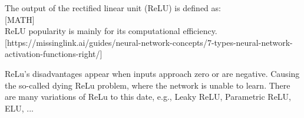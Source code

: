 
The output of the rectified linear unit (ReLU) is defined as:\\

[MATH]\\

ReLU popularity is mainly for its computational efficiency.
[https://missinglink.ai/guides/neural-network-concepts/7-types-neural-network-activation-functions-right/]

ReLu's disadvantages appear when inputs approach zero or are negative. Causing the so-called dying ReLu problem, where the network is unable to learn.
There are many variations of ReLu to this date, e.g., Leaky ReLU, Parametric ReLU, ELU, ... 